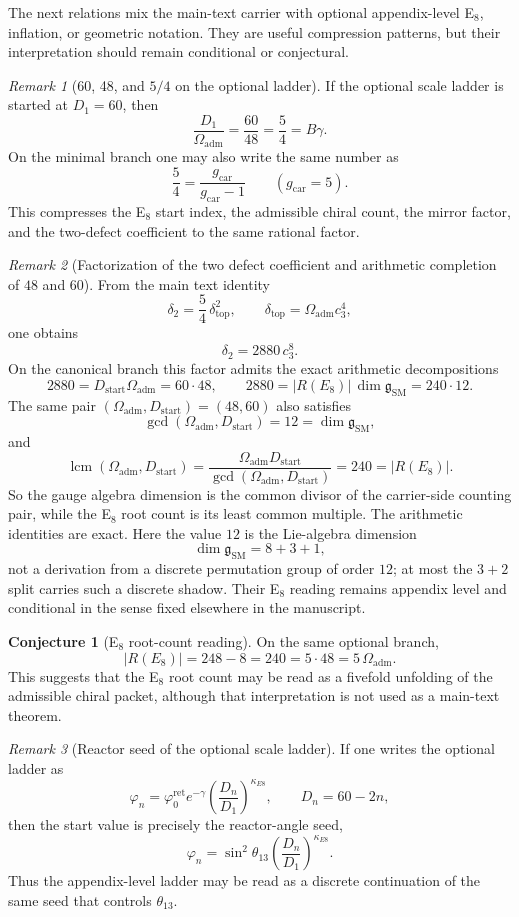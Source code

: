 \documentclass[11pt,a4paper]{article}
\theoremstyle{definition}
\newtheorem{conjecture}[theorem]{Conjecture}
\theoremstyle{remark}
\newtheorem*{remark}{Remark}
\newcommand{\cthree}{c_3}
\newcommand{\phiz}{\varphi_0^{\mathrm{ret}}}
\newcommand{\deltatop}{\delta_{\mathrm{top}}}
\newcommand{\SM}{\mathrm{SM}}
\newcommand{\Oadm}{\Omega_{\mathrm{adm}}}
\newcommand{\gcar}{g_{\mathrm{car}}}
\newcommand{\Dstart}{D_{\mathrm{start}}}
\begin{document}
The next relations mix the main-text carrier with optional appendix-level E$_8$, inflation, or geometric notation. They are useful compression patterns, but their interpretation should remain conditional or conjectural.

\begin{remark}[60, 48, and \texorpdfstring{$5/4$}{5/4} on the optional ladder]
If the optional scale ladder is started at $D_1=60$, then
\[
\frac{D_1}{\Oadm}=\frac{60}{48}=\frac54=B\gamma.
\]
On the minimal branch one may also write the same number as
\[
\frac54=\frac{\gcar}{\gcar-1}\qquad (\gcar=5).
\]
This compresses the E$_8$ start index, the admissible chiral count, the mirror factor, and the two-defect coefficient to the same rational factor.
\end{remark}

\begin{remark}[Factorization of the two defect coefficient and arithmetic completion of $48$ and $60$]\label{rem:defect-factorization-gcd-lcm}
From the main text identity
\[
\delta_2=\frac{5}{4}\,\deltatop^2,
\qquad
\deltatop=\Oadm\cthree^4,
\]
one obtains
\[
\delta_2=2880\,\cthree^8.
\]
On the canonical branch this factor admits the exact arithmetic decompositions
\[
2880=\Dstart\Oadm=60\cdot48,
\qquad
2880=|R(E_8)|\,\dim \mathfrak g_{\SM}=240\cdot12.
\]
The same pair $(\Oadm,\Dstart)=(48,60)$ also satisfies
\[
\gcd(\Oadm,\Dstart)
=
12
=
\dim \mathfrak g_{\SM},
\]
and
\[
\operatorname{lcm}(\Oadm,\Dstart)
=
\frac{\Oadm\Dstart}
{\gcd(\Oadm,\Dstart)}
=
240
=
|R(E_8)|.
\]
So the gauge algebra dimension is the common divisor of the carrier-side counting pair, while the E$_8$ root count is its least common multiple. The arithmetic identities are exact. Here the value $12$ is the Lie-algebra dimension
\[
\dim\mathfrak g_{\SM}=8+3+1,
\]
not a derivation from a discrete permutation group of order $12$; at most the $3+2$ split carries such a discrete shadow. Their E$_8$ reading remains appendix level and conditional in the sense fixed elsewhere in the manuscript.
\end{remark}

\begin{conjecture}[E$_8$ root-count reading]
On the same optional branch,
\[
|R(E_8)|=248-8=240=5\cdot48=5\,\Oadm.
\]
This suggests that the E$_8$ root count may be read as a fivefold unfolding of the admissible chiral packet, although that interpretation is not used as a main-text theorem.
\end{conjecture}

\begin{remark}[Reactor seed of the optional scale ladder]
If one writes the optional ladder as
\[
\varphi_n=\phiz e^{-\gamma}\left(\frac{D_n}{D_1}\right)^{\kappa_{E8}},
\qquad
D_n=60-2n,
\]
then the start value is precisely the reactor-angle seed,
\[
\varphi_n=\sin^2\theta_{13}\left(\frac{D_n}{D_1}\right)^{\kappa_{E8}}.
\]
Thus the appendix-level ladder may be read as a discrete continuation of the same seed that controls $\theta_{13}$.
\end{remark}
\end{document}
